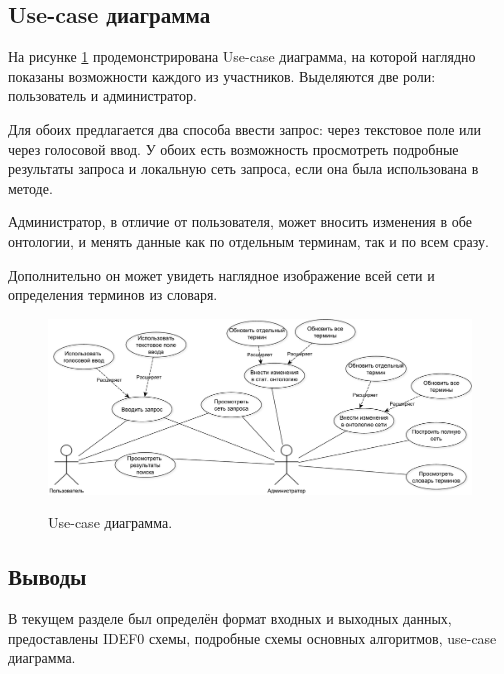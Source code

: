 \newpage

\subsection{Use-case диаграмма}
На рисунке \ref{fig39:image} продемонстрирована Use-case диаграмма, на которой наглядно показаны возможности каждого из участников. Выделяются две роли: пользователь и администратор. 

Для обоих предлагается два способа ввести запрос: через текстовое поле или через голосовой ввод. У обоих есть возможность просмотреть подробные результаты запроса  и локальную сеть запроса, если она была использована в методе.

Администратор, в отличие от пользователя, может вносить изменения в обе онтологии, и менять данные как по отдельным терминам, так и по всем сразу.

Дополнительно он может увидеть наглядное изображение всей сети и \, определения терминов из словаря.
\begin{figure}[h]
	\begin{center}
		{\includegraphics[scale = 0.45]{img/use_case/use_case.pdf}}
		\caption{Use-case диаграмма.}
		\label{fig39:image}
	\end{center}
\end{figure}

\subsection*{Выводы}
В текущем разделе был определён формат входных и выходных данных, предоставлены IDEF0 схемы, подробные схемы основных алгоритмов, use-case диаграмма.
